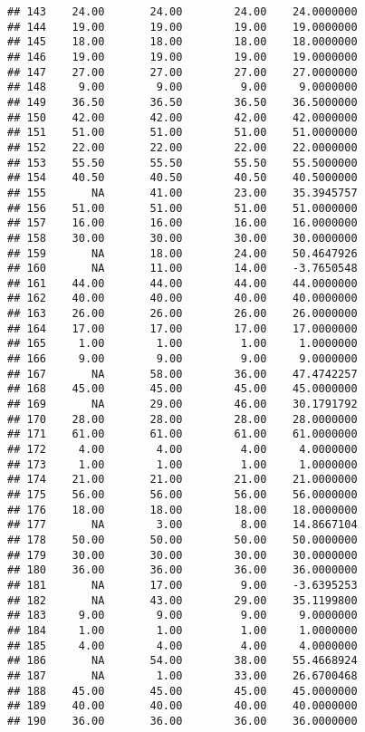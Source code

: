 \documentclass[
]{article}
\begin{document}
\begin{verbatim}
## 143    24.00       24.00        24.00    24.0000000
## 144    19.00       19.00        19.00    19.0000000
## 145    18.00       18.00        18.00    18.0000000
## 146    19.00       19.00        19.00    19.0000000
## 147    27.00       27.00        27.00    27.0000000
## 148     9.00        9.00         9.00     9.0000000
## 149    36.50       36.50        36.50    36.5000000
## 150    42.00       42.00        42.00    42.0000000
## 151    51.00       51.00        51.00    51.0000000
## 152    22.00       22.00        22.00    22.0000000
## 153    55.50       55.50        55.50    55.5000000
## 154    40.50       40.50        40.50    40.5000000
## 155       NA       41.00        23.00    35.3945757
## 156    51.00       51.00        51.00    51.0000000
## 157    16.00       16.00        16.00    16.0000000
## 158    30.00       30.00        30.00    30.0000000
## 159       NA       18.00        24.00    50.4647926
## 160       NA       11.00        14.00    -3.7650548
## 161    44.00       44.00        44.00    44.0000000
## 162    40.00       40.00        40.00    40.0000000
## 163    26.00       26.00        26.00    26.0000000
## 164    17.00       17.00        17.00    17.0000000
## 165     1.00        1.00         1.00     1.0000000
## 166     9.00        9.00         9.00     9.0000000
## 167       NA       58.00        36.00    47.4742257
## 168    45.00       45.00        45.00    45.0000000
## 169       NA       29.00        46.00    30.1791792
## 170    28.00       28.00        28.00    28.0000000
## 171    61.00       61.00        61.00    61.0000000
## 172     4.00        4.00         4.00     4.0000000
## 173     1.00        1.00         1.00     1.0000000
## 174    21.00       21.00        21.00    21.0000000
## 175    56.00       56.00        56.00    56.0000000
## 176    18.00       18.00        18.00    18.0000000
## 177       NA        3.00         8.00    14.8667104
## 178    50.00       50.00        50.00    50.0000000
## 179    30.00       30.00        30.00    30.0000000
## 180    36.00       36.00        36.00    36.0000000
## 181       NA       17.00         9.00    -3.6395253
## 182       NA       43.00        29.00    35.1199800
## 183     9.00        9.00         9.00     9.0000000
## 184     1.00        1.00         1.00     1.0000000
## 185     4.00        4.00         4.00     4.0000000
## 186       NA       54.00        38.00    55.4668924
## 187       NA        1.00        33.00    26.6700468
## 188    45.00       45.00        45.00    45.0000000
## 189    40.00       40.00        40.00    40.0000000
## 190    36.00       36.00        36.00    36.0000000

\end{verbatim}
\end{document}
